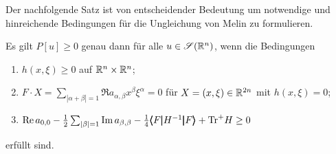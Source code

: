 Der nachfolgende Satz ist von entscheidender Bedeutung um notwendige und hinreichende Bedingungen für die Ungleichung von Melin zu formulieren.

\begin{thm}\label{satz:thm2.4}
Es gilt $P[u]\ge0$ genau dann für alle $u\in\mathscr S(\mathbb R^n)$, wenn die Bedingungen
\begin{enumerate}
\item  $h(x,\xi)\ge0$ auf $\mathbb R^n\times\mathbb R^n$;
\item $F \cdot X = \sum_{|\alpha+\beta|=1} \Re a_{\alpha,\beta} x^\beta\xi^\alpha = 0$ für $X=(x,\xi)\in\mathbb R^{2n}$ mit $h(x,\xi)=0$;
\item $\operatorname{Re} a_{0,0} - \frac12 \sum_{|\beta|=1} \operatorname{Im} a_{\beta,\beta} -\frac14  \pmb\langle F\pmb|H^{-1}\pmb|F\pmb\rangle + {\mathrm{Tr}}^+ H \ge 0$
\end{enumerate}
erfüllt sind.
\end{thm}
